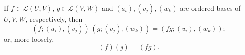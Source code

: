 If $f \in \mathcal{L}(U, V)$, $g \in \mathcal{L}(V, W)$ and $(u_i), (v_j), (w_k)$ are ordered bases of $U, V, W$, respectively, then
$$
(f; (u_i), (v_j))\,(g; (v_j), (w_k)) = (fg; (u_i), (w_k));
$$
or, more loosely,
$$
(f)(g) = (fg).
$$
